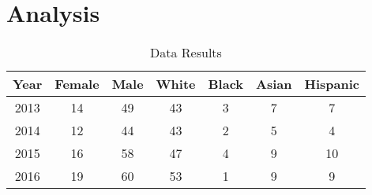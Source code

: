 \documentclass{article}
\begin{document}
	\section*{Analysis}
	\begin{table}[h!]
	    \centering
	    \begin{tabular}{c|c|c|c|c|c|c}
	    Year	& 	 Female &  Male & White & Black & Asian & Hispanic\\
	    \hline
	    2013		& 	14 	& 	49 	& 	43 	& 	3 	& 	7 	& 	7\\
	    2014		& 	12 	& 	44 	& 	43 	& 	2 	& 	5 	& 	4\\
	    2015		& 	16 	& 	58 	& 	47 	& 	4 	& 	9 	& 	10\\
	    2016		& 	19 	&	60 	& 	53 	&	1 	& 	9 	& 	9\\
	    \end{tabular}
	    \caption{Data Results}
	    \label{tbl:Data Results}
	\end{table}
\end{document}
